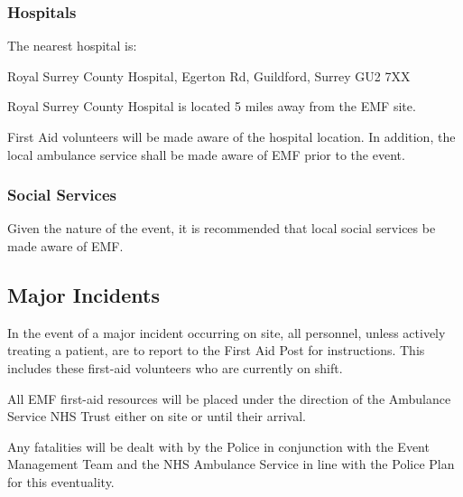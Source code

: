 \subsubsection{Hospitals}

The nearest hospital is:

Royal Surrey County Hospital, Egerton Rd, Guildford, Surrey GU2 7XX

Royal Surrey County Hospital is located 5 miles away from the EMF site.

First Aid volunteers will be made aware of the hospital location. In addition,
the local ambulance service shall be made aware of EMF prior to the event.

\subsubsection{Social Services}

Given the nature of the event, it is recommended that local social services be made aware of EMF.

\subsection{Major Incidents}

In the event of a major incident occurring on site, all personnel, unless
actively treating a patient, are to report to the First Aid Post for
instructions. This includes these first-aid volunteers who are currently on
shift.

All EMF first-aid resources will be placed under the direction of the Ambulance
Service NHS Trust either on site or until their arrival.

Any fatalities will be dealt with by the Police in conjunction with the Event
Management Team and the NHS Ambulance Service in line with the Police Plan for
this eventuality.
